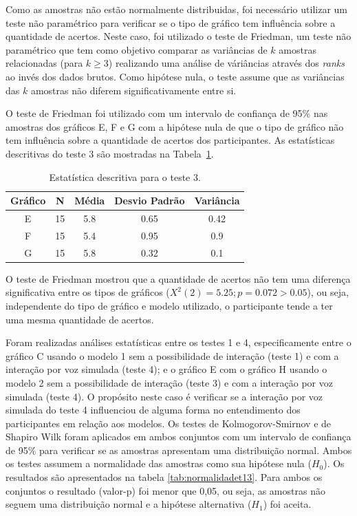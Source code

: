 \documentclass[
	12pt,				%
	openright,			%
	oneside,			%
	a4paper,			%
	english,			%
	brazil				%
	]{abntex2}
\begin{document}
Como as amostras não estão normalmente distribuidas, foi necessário utilizar um teste não paramétrico para verificar se o tipo de gráfico tem influência sobre a quantidade de acertos. Neste caso, foi utilizado o teste de Friedman, um teste não paramétrico que tem como objetivo comparar as variâncias de $k$ amostras relacionadas (para $k \geq 3$) realizando uma análise de váriâncias através dos \textit{ranks} ao invés dos dados brutos. Como hipótese nula, o teste assume que as variâncias das $k$ amostras não diferem significativamente entre si.

O teste de Friedman foi utilizado com um intervalo de confiança de 95\% nas amostras dos gráficos E, F e G com a hipótese nula de que o tipo de gráfico não tem influência sobre a quantidade de acertos dos participantes. As estatísticas descritivas do teste 3 são mostradas na Tabela~\ref{tab:test3_desc}.

\begin{table}[!h]
\centering
\def\arraystretch{1.25}
\caption{Estatística descritiva para o teste 3.}
\label{tab:test3_desc}
\begin{tabular}{|c|c|c|c|c|}

\hline
\textbf{Gráfico}&\textbf{N}&\textbf{Média}&\textbf{Desvio Padrão}&\textbf{Variância}\\
\hline
E & 15 & 5.8 & 0.65 & 0.42 \\
F & 15 & 5.4 & 0.95 & 0.9 \\
G & 15 & 5.8 & 0.32 & 0.1 \\ 
\hline



\hline
\end{tabular}
\end{table}

O teste de Friedman mostrou que a quantidade de acertos não tem uma diferença significativa entre os tipos de gráficos ($X^2(2) = 5.25; p = 0.072 > 0.05$), ou seja, independente do tipo de gráfico e modelo utilizado, o participante tende a ter uma mesma quantidade de acertos.

Foram realizadas análises estatísticas entre os testes 1 e 4, especificamente entre o gráfico C usando o modelo 1 sem a possibilidade de interação (teste 1) e com a interação por voz simulada (teste 4);  e o gráfico E com o gráfico H usando o modelo 2 sem a possibilidade de interação (teste 3) e com a interação por voz simulada (teste 4). O propósito neste caso é verificar se a interação por voz simulada do teste 4 influenciou de alguma forma no entendimento dos participantes em relação aos modelos. Os testes de Kolmogorov-Smirnov e de Shapiro Wilk foram aplicados em ambos conjuntos com um intervalo de confiança de 95\% para verificar se as amostras apresentam uma distribuição normal. Ambos os testes assumem a normalidade das amostras como sua hipótese nula ($H_{0}$). Os resultados são apresentados na tabela \ref{tab:normalidadet13}. Para ambos os conjuntos o resultado (valor-p) foi menor que 0,05, ou seja, as amostras não seguem uma distribuição normal e a hipótese alternativa ($H_{1}$) foi aceita.
\end{document}
